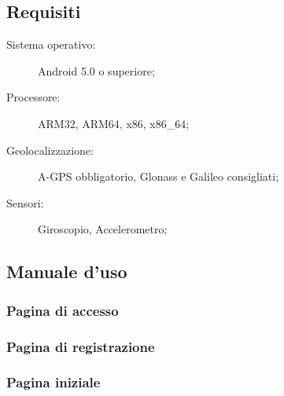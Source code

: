 \documentclass[../manuale-utente.tex]{subfiles}
\begin{document}
\subsection{Requisiti}%
\label{sub:requisiti}

\begin{description}
    \item[Sistema operativo:] Android 5.0 o superiore;
    \item[Processore:] ARM32, ARM64, x86, x86\_64;
    \item[Geolocalizzazione:] A-GPS obbligatorio, Glonass e Galileo consigliati;
    \item[Sensori:] Giroscopio, Accelerometro;
\end{description}


\subsection{Manuale d'uso}%
\label{sub:manuale-duso-mobile}


\subsubsection{Pagina di accesso}%
\label{sub:pagina-di-accesso}

%     

\subsubsection{Pagina di registrazione}%
\label{sub:pagina-di-registrazione}


\subsubsection{Pagina iniziale}%
\label{sub:pagina-iniziale}


\end{document}
